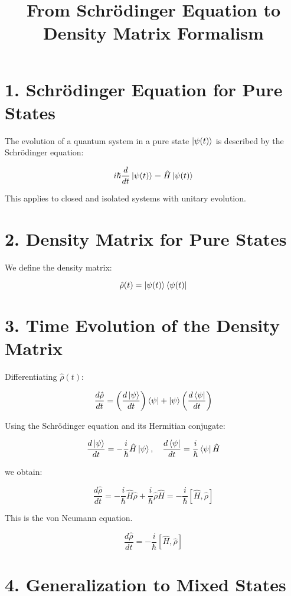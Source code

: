 \documentclass[12pt]{article}
\title{From Schrödinger Equation to Density Matrix Formalism}
\author{}
\date{}
\begin{document}
\maketitle

\section*{1. Schrödinger Equation for Pure States}

The evolution of a quantum system in a pure state \( \ket{\psi(t)} \) is described by the Schrödinger equation:

\[
i\hbar \frac{d}{dt} \ket{\psi(t)} = \hat{H} \ket{\psi(t)}
\]


This applies to closed and isolated systems with unitary evolution.

\section*{2. Density Matrix for Pure States}

We define the density matrix:

\[
\hat{\rho}(t) = \ket{\psi(t)} \bra{\psi(t)}
\]



\section*{3. Time Evolution of the Density Matrix}

Differentiating \( \hat{\rho}(t) \):

\[
\frac{d\hat{\rho}}{dt} = \left( \frac{d\ket{\psi}}{dt} \right) \bra{\psi} + \ket{\psi} \left( \frac{d\bra{\psi}}{dt} \right)
\]

Using the Schrödinger equation and its Hermitian conjugate:

\[
\frac{d\ket{\psi}}{dt} = -\frac{i}{\hbar} \hat{H} \ket{\psi}, \quad \frac{d\bra{\psi}}{dt} = \frac{i}{\hbar} \bra{\psi} \hat{H}
\]

we obtain:

\[
\frac{d\hat{\rho}}{dt} = -\frac{i}{\hbar} \hat{H} \hat{\rho} + \frac{i}{\hbar} \hat{\rho} \hat{H} = -\frac{i}{\hbar} [\hat{H}, \hat{\rho}]
\]

This is the von Neumann equation.

\[
\boxed{
\frac{d\hat{\rho}}{dt} = -\frac{i}{\hbar} [\hat{H}, \hat{\rho}]
}
\]

\section*{4. Generalization to Mixed States}
\end{document}
